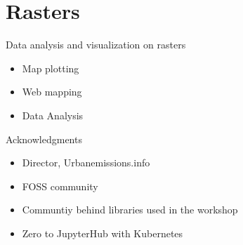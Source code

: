 \section[Rasters]{Rasters}
\begin{frame}{Data analysis and visualization on rasters}
	\begin{beamerboxesrounded}{}
		\begin{itemize}
		    \item Map plotting
			\item Web mapping
			\item Data Analysis
		\end{itemize}
	\end{beamerboxesrounded}
\end{frame}



\begin{frame}{Acknowledgments}
	\begin{beamerboxesrounded}{}
		\begin{itemize}
		    \item Director, Urbanemissions.info
			\item FOSS community
			\item Communtiy behind libraries used in the workshop 
			\item Zero to JupyterHub with Kubernetes
		\end{itemize}
	\end{beamerboxesrounded}
\end{frame}



